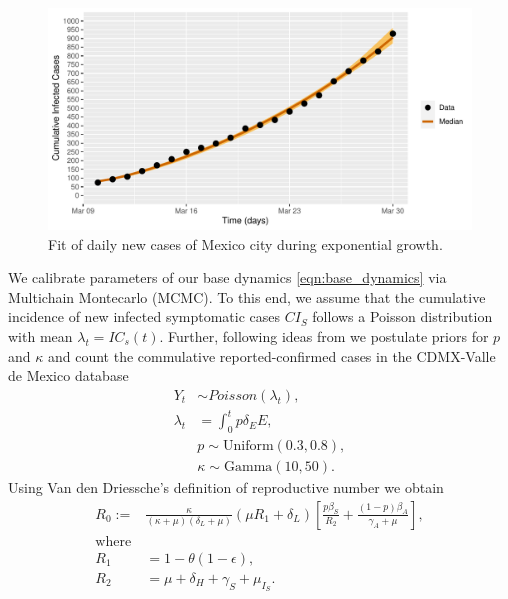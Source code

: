 \begin{figure}[htb]
    \centering
    \includegraphics[scale=0.7, keepaspectratio]{./cdmx_CIs_data_begining_fit}
    \caption{%
        Fit of daily new cases of Mexico city
        during exponential growth.
    }
    \label{fig:data_CDMX_fitting}
\end{figure}
%
We calibrate parameters of our base dynamics
\eqref{eqn:base_dynamics} via Multichain Montecarlo (MCMC).
To this end, we assume that the cumulative
incidence of new infected symptomatic cases $CI_S$
follows a Poisson distribution with mean $\lambda_t = IC_s(t)$. Further,
following ideas from \cite{Acuna2020} we postulate priors for $p$ and $\kappa$
and count the commulative reported-confirmed cases in the CDMX-Valle de Mexico
database \cite{cdmxDATA}
\begin{equation}
    \label{eqn:boservation_model}
    \begin{aligned}
        Y_t & \sim Poisson(\lambda_t),
        \\
        \lambda_t
        &=
        \int_{0}^t p \delta_E E ,
        \\
        & p \sim \text{Uniform} (0.3, 0.8),
        \\
        & \kappa \sim \text{Gamma}(10, 50).
    \end{aligned}
\end{equation}
%
Using Van den Driessche's \cite{Van2002} definition of reproductive number
we obtain
\begin{equation*}
    \label{eqn:reproductive_number}
    \begin{aligned}
        R_0 :=
        &
        \frac{\kappa}{(\kappa + \mu)(\delta_L + \mu)}
        \left(
            \mu R_1 + \delta_L
        \right)
        \left[
            \frac{p\beta_S}{R_2}
            +\frac{(1 - p) \beta_A}{\gamma_A+\mu}
        \right],
    \\
    \text{where} &
    \\
        R_1 &= 1 - \theta(1 - \epsilon),
    \\
        R_2 &= \mu + \delta_H + \gamma_S + \mu_{I_{S}}.
    \end{aligned}
\end{equation*}

